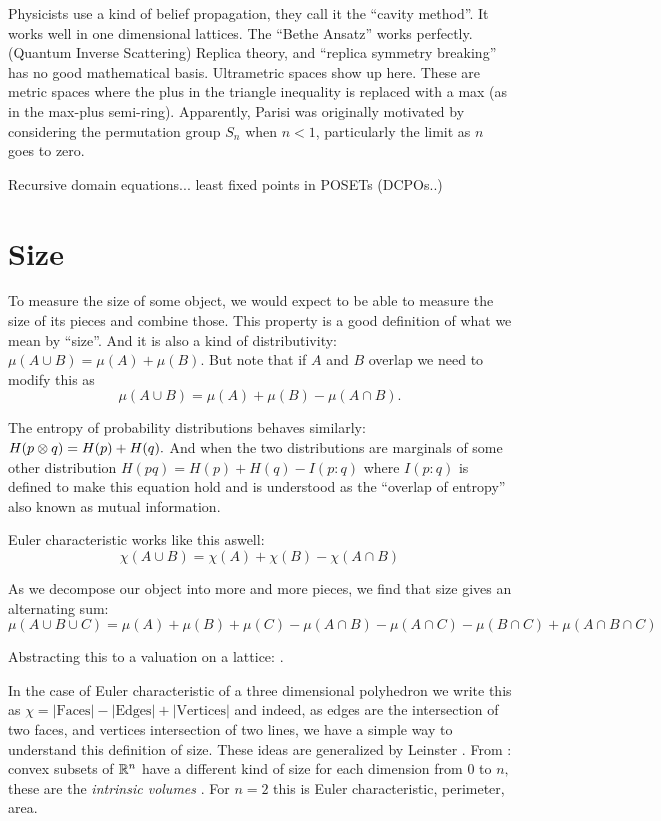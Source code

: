 \documentclass[11pt]{article}
\begin{document}
Physicists use a kind of belief propagation, they call it the ``cavity method''. 
It works well in one dimensional lattices. The ``Bethe Ansatz'' works perfectly.
(Quantum Inverse Scattering)
Replica theory, and ``replica symmetry breaking'' has no good mathematical basis.
Ultrametric spaces show up here. These are metric spaces where
the plus in the triangle inequality is replaced with a max (as in the max-plus semi-ring).
Apparently, Parisi was originally motivated by considering
the permutation group $S_n$ when $n<1$, particularly the limit as $n$ goes to zero.

Recursive domain equations... least fixed points in POSETs (DCPOs..)


\section{Size}

To measure the size of some object, we would
expect to be able to measure the size of its pieces
and combine those. 
This property is a good definition of what we
mean by ``size''. And it is also a kind of
distributivity: 
$\mu(A\cup B) = \mu(A) + \mu(B).$
But note that if $A$ and $B$ overlap we need to modify this
as
$$\mu(A\cup B) = \mu(A) + \mu(B) - \mu(A\cap B).$$

The entropy of probability distributions behaves similarly:
$H(p\otimes q) = H(p) + H(q).$
And when the two distributions are marginals of some other distribution
$H(pq) = H(p) + H(q) - I(p:q)$
where $I(p:q)$ is defined to make this equation hold and is
understood as the ``overlap of entropy'' also known as mutual information.

Euler characteristic works like this aswell:
$$
\chi(A\cup B) = \chi(A) + \chi(B) - \chi(A\cap B)
$$

As we decompose our object into more and more pieces,
we find that size gives an alternating sum:
$$
\mu(A\cup B\cup C) = \mu(A) + \mu(B) + \mu(C) 
    - \mu(A\cap B) - \mu(A\cap C) - \mu(B\cap C)
    + \mu(A\cap B \cap C)
$$

Abstracting this to a valuation on a lattice:
\cite{Klain1997}.

In the case of Euler characteristic of a three dimensional polyhedron
we write this as 
$\chi = |\mbox{Faces}| - |\mbox{Edges}| + |\mbox{Vertices}|$
and indeed, as edges are the intersection
of two faces, and vertices intersection of two lines,
we have a simple way to understand this definition of size.
These ideas are generalized by Leinster \cite{Leinster2008,Leinster2013,Leinster2014}.
From \cite{Leinster2014}: convex subsets of $\mathbb R^n$ have
a different kind of size for each dimension from $0$ to $n,$
these are the \emph{intrinsic volumes} \cite{Klain1997}.
For $n=2$ this is Euler characteristic, perimeter, area.
\end{document}
